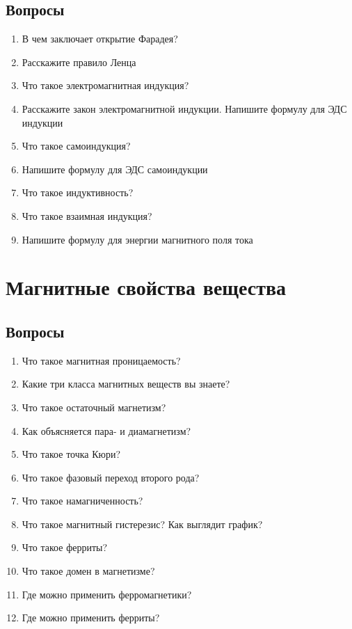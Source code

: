 \documentclass[12pt,a4paper]{report}
\begin{document}
\section{Вопросы}
\begin{enumerate}
\item В чем заключает открытие Фарадея?
\item Расскажите правило Ленца
\item Что такое электромагнитная индукция?
\item Расскажите закон электромагнитной индукции. Напишите формулу для ЭДС индукции
\item Что такое самоиндукция?
\item Напишите формулу для ЭДС самоиндукции
\item Что такое индуктивность?
\item Что такое взаимная индукция?
\item Напишите формулу для энергии магнитного поля тока
\end{enumerate}

\chapter{Магнитные свойства вещества}
\section{Вопросы}
\begin{enumerate}
\item Что такое магнитная проницаемость?
\item Какие три класса магнитных веществ вы знаете?
\item Что такое остаточный магнетизм?
\item Как объясняется пара- и диамагнетизм?
\item Что такое точка Кюри?
\item Что такое фазовый переход второго рода?
\item Что такое намагниченность?
\item Что такое магнитный гистерезис? Как выглядит график?
\item Что такое ферриты?
\item Что такое домен в магнетизме?
\item Где можно применить ферромагнетики?
\item Где можно применить ферриты?
\end{enumerate}
\end{document}
